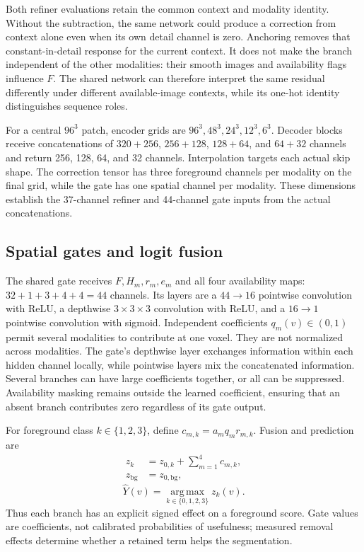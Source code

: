 \documentclass[conference]{IEEEtran}
\begin{document}
Both refiner evaluations retain the common context and modality identity. Without the subtraction, the same network could produce a correction from context alone even when its own detail channel is zero. Anchoring removes that constant-in-detail response for the current context. It does not make the branch independent of the other modalities: their smooth images and availability flags influence $F$. The shared network can therefore interpret the same residual differently under different available-image contexts, while its one-hot identity distinguishes sequence roles.

For a central $96^3$ patch, encoder grids are $96^3,48^3,24^3,12^3,6^3$. Decoder blocks receive concatenations of $320+256$, $256+128$, $128+64$, and $64+32$ channels and return 256, 128, 64, and 32 channels. Interpolation targets each actual skip shape. The correction tensor has three foreground channels per modality on the final grid, while the gate has one spatial channel per modality. These dimensions establish the 37-channel refiner and 44-channel gate inputs from the actual concatenations.

\subsection{Spatial gates and logit fusion}
The shared gate receives $F,H_m,r_m,e_m$ and all four availability maps: $32+1+3+4+4=44$ channels. Its layers are a $44\to16$ pointwise convolution with ReLU, a depthwise $3\times3\times3$ convolution with ReLU, and a $16\to1$ pointwise convolution with sigmoid. Independent coefficients $q_m(v)\in(0,1)$ permit several modalities to contribute at one voxel. They are not normalized across modalities. The gate's depthwise layer exchanges information within each hidden channel locally, while pointwise layers mix the concatenated information. Several branches can have large coefficients together, or all can be suppressed. Availability masking remains outside the learned coefficient, ensuring that an absent branch contributes zero regardless of its gate output.

For foreground class $k\in\{1,2,3\}$, define $c_{m,k}=a_mq_mr_{m,k}$. Fusion and prediction are
\begin{equation}
\begin{aligned}
z_k&=z_{0,k}+\sum_{m=1}^{4}c_{m,k},\\
z_{\mathrm{bg}}&=z_{0,\mathrm{bg}},
\end{aligned}
\label{eq:fusion}
\end{equation}
\begin{equation}
\hat Y(v)=\underset{k\in\{0,1,2,3\}}{\operatorname{arg\,max}}z_k(v).
\label{eq:prediction}
\end{equation}
Thus each branch has an explicit signed effect on a foreground score. Gate values are coefficients, not calibrated probabilities of usefulness; measured removal effects determine whether a retained term helps the segmentation.
\end{document}
